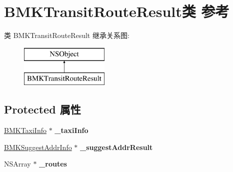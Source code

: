 \hypertarget{interface_b_m_k_transit_route_result}{\section{B\+M\+K\+Transit\+Route\+Result类 参考}
\label{interface_b_m_k_transit_route_result}
}
类 B\+M\+K\+Transit\+Route\+Result 继承关系图\+:\begin{figure}[H]
\begin{center}
\leavevmode
\includegraphics[height=2.000000cm]{interface_b_m_k_transit_route_result}
\end{center}
\end{figure}
\subsection*{Protected 属性}
\begin{DoxyCompactItemize}
\item 
\hypertarget{interface_b_m_k_transit_route_result_ae443891449bb1e950302c880fa70256f}{\hyperlink{interface_b_m_k_taxi_info}{B\+M\+K\+Taxi\+Info} $\ast$ {\bfseries \+\_\+taxi\+Info}}\label{interface_b_m_k_transit_route_result_ae443891449bb1e950302c880fa70256f}

\item 
\hypertarget{interface_b_m_k_transit_route_result_a10b93b18a6b3009f5f871bc6f54b2403}{\hyperlink{interface_b_m_k_suggest_addr_info}{B\+M\+K\+Suggest\+Addr\+Info} $\ast$ {\bfseries \+\_\+suggest\+Addr\+Result}}\label{interface_b_m_k_transit_route_result_a10b93b18a6b3009f5f871bc6f54b2403}

\item 
\hypertarget{interface_b_m_k_transit_route_result_a0e197c7e3c3992c90a40ab4ee4b966f1}{N\+S\+Array $\ast$ {\bfseries \+\_\+routes}}\label{interface_b_m_k_transit_route_result_a0e197c7e3c3992c90a40ab4ee4b966f1}

\end{DoxyCompactItemize}
